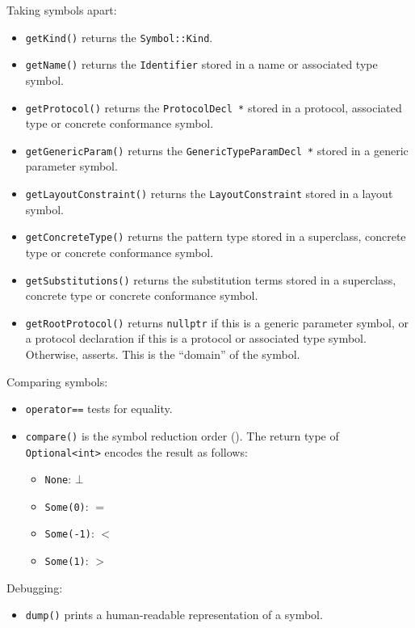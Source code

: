 \documentclass[../generics]{subfiles}
\begin{document}
Taking symbols apart:
\begin{itemize}
\item \texttt{getKind()} returns the \texttt{Symbol::Kind}.
\item \texttt{getName()} returns the \texttt{Identifier} stored in a name or associated type symbol.
\item \texttt{getProtocol()} returns the \texttt{ProtocolDecl *} stored in a protocol, associated type or concrete conformance symbol.
\item \texttt{getGenericParam()} returns the \texttt{GenericTypeParamDecl *} stored in a generic parameter symbol.
\item \texttt{getLayoutConstraint()} returns the \texttt{LayoutConstraint} stored in a layout symbol.
\item \texttt{getConcreteType()} returns the pattern type stored in a superclass, concrete type or concrete conformance symbol.
\item \texttt{getSubstitutions()} returns the substitution terms stored in a superclass, concrete type or concrete conformance symbol.
\item \texttt{getRootProtocol()} returns \texttt{nullptr} if this is a generic parameter symbol, or a protocol declaration if this is a protocol or associated type symbol. Otherwise, asserts. This is the ``domain'' of the symbol.
\end{itemize}
Comparing symbols:
\begin{itemize}
\item \texttt{operator==} tests for equality.
\item \texttt{compare()} is the symbol reduction order (). The return type of \texttt{Optional<int>} encodes the result as follows:
\begin{itemize}
\item \verb|None|: $\bot$
\item \verb|Some(0)|: $=$
\item \verb|Some(-1)|: $<$
\item \verb|Some(1)|: $>$
\end{itemize}
\end{itemize}
Debugging:
\begin{itemize}
\item \texttt{dump()} prints a human-readable representation of a symbol.
\end{itemize}
\end{document}
